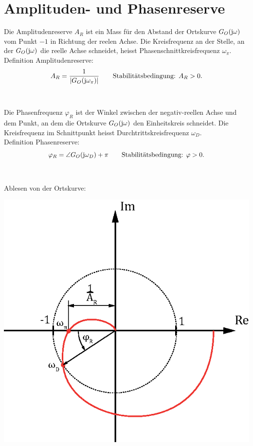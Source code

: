 \section{Amplituden- und Phasenreserve}
Die Amplitudenreserve $A_R$ ist ein Mass für den Abstand der Ortskurve $G_O(\im\omega)$ vom Punkt $-1$ in Richtung der reelen Achse. Die Kreisfrequenz an der Stelle, an der $G_O(\im\omega)$ die reelle Achse schneidet, heisst Phasenschnittkreisfrequenz $\omega_\pi$.\\
Definition Amplitudenreserve:
\[
	A_R = \frac{1}{\left|G_O(\im\omega_\pi)\right|} \qquad \text{Stabilitätsbedingung: } A_R > 0.
\]\\\\
Die Phasenfrequenz $\varphi_R$ ist der Winkel zwischen der negativ-reellen Achse und dem Punkt, an dem die Ortskurve  $G_O(\im\omega)$ den Einheitskreis schneidet. Die Kreisfrequenz im Schnittpunkt heisst Durchtrittskreisfrequenz $\omega_D$.\\
Definition Phasenreserve:
\[
	\varphi_R = \angle{G_O(\im\omega_D)} + \pi \qquad \text{Stabilitätsbedingung: } \varphi > 0.
\]\\\\
Ablesen von der Ortskurve:
\begin{center}
	\includegraphics[scale=0.7]{../fig/ort_reserve.eps}
\end{center}
